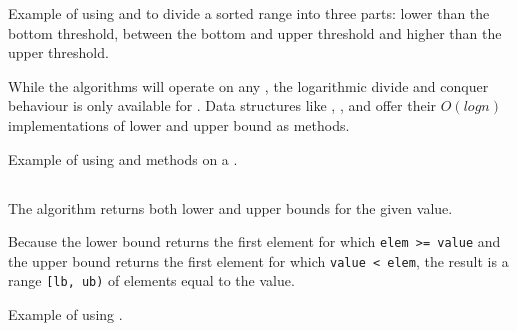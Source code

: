 \begin{codebox}[breakable]{\href{https://compiler-explorer.com/z/cbz464eWe}{\ExternalLink}}
\footnotesize Example of using  and  to divide a sorted range into three parts: lower than the bottom threshold, between the bottom and upper threshold and higher than the upper threshold.
\tcblower
{}
\end{codebox}

While the algorithms will operate on any , the logarithmic divide and conquer behaviour is only available for . Data structures like , ,  and  offer their $O(logn)$ implementations of lower and upper bound as methods.

\begin{codebox}[]{\href{https://compiler-explorer.com/z/o9Wdvzno9}{\ExternalLink}}
\footnotesize Example of using  and  methods on a .
\tcblower
{}
\end{codebox}

\subsection{\texorpdfstring{}{\texttt{std::equal\_range}}}

The  algorithm returns both lower and upper bounds for the given value.


Because the lower bound returns the first element for which \texttt{elem >= value} and the upper bound returns the first element for which \texttt{value < elem}, the result is a range \texttt{[lb, ub)} of elements equal to the value.

\begin{codebox}[breakable]{\href{https://compiler-explorer.com/z/bhW73YG1b}{\ExternalLink}}
\footnotesize Example of using .
\tcblower
{}
\end{codebox}

\subsection{\texorpdfstring{}{\texttt{std::partition\_point}}}

